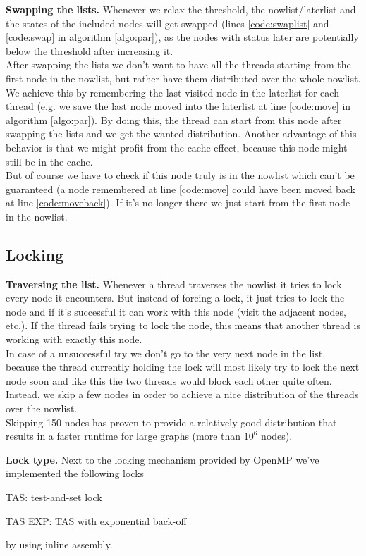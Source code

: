 \documentclass[letterpaper]{article}
\newcommand{\mypar}[1]{{\bf #1.}}
\begin{document}
\mypar{Swapping the lists}
Whenever we relax the threshold, the nowlist/laterlist and the states of the included nodes will get swapped (lines \ref{code:swaplist} and \ref{code:swap} in algorithm \ref{algo:par}), as the nodes with status later are potentially below the threshold after increasing it.\\
After swapping the lists  we don't want to have all the threads starting from the first node in the nowlist, but rather have them distributed over the whole nowlist. We achieve this by remembering the last visited node in the laterlist for each thread (e.g. we save the last node moved into the laterlist at line \ref{code:move} in algorithm \ref{algo:par}). By doing this, the thread can start from this node after swapping the lists and we get the wanted distribution. Another advantage of this behavior is that we might profit from the cache effect, because this node might still be in the cache.\\
But of course we have to check if this node truly is in the nowlist which can't be guaranteed (a node remembered at line \ref{code:move} could have been moved back at line \ref{code:moveback}). If it's no longer there we just start from the first node in the nowlist.

\subsection{Locking}\label{ssec:lock}

\mypar{Traversing the list}
Whenever a thread traverses the nowlist it tries to lock every node it encounters. But instead of forcing a lock, it just tries to lock the node and if it's successful it can work with this node (visit the adjacent nodes, etc.). If the thread fails trying to lock the node, this means that another thread is working with exactly this node.\\
In case of a unsuccessful try we don't go to the very next node in the list, because the thread currently holding the lock will most likely try to lock the next node soon and like this the two threads would block each other quite often. Instead, we skip a few nodes in order to achieve a nice distribution of the threads over the nowlist.\\
Skipping 150 nodes has proven to provide a relatively good distribution that results in a faster runtime for large graphs (more than $10^6$ nodes).

\mypar{Lock type}
Next to the locking mechanism provided by OpenMP we've implemented the following locks
\begin{compactitem}
\item TAS: test-and-set lock
\item TAS EXP: TAS with exponential back-off
\end{compactitem}
by using inline assembly.
\end{document}

